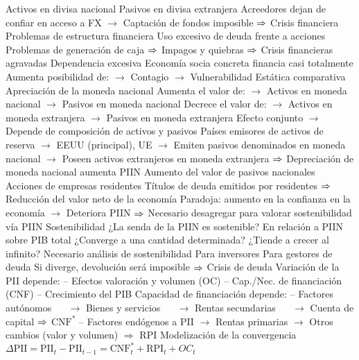 \documentclass{nuevotema}
\begin{document}
\begin{esquemal}
				\4[] Activos en divisa nacional
				\4[] Pasivos en divisa extranjera
				\4[] Acreedores dejan de confiar en acceso a FX
				\4[] $\to$ Captación de fondos imposible
				\4[] $\Rightarrow$ Crisis financiera
				\4 Problemas de estructura financiera
				\4[] Uso excesivo de deuda frente a acciones
				\4[] Problemas de generación de caja
				\4[] $\Rightarrow$ Impagos y quiebras
				\4[] $\Rightarrow$ Crisis financieras agravadas
				\4 Dependencia excesiva
				\4[] Economía socia concreta financia casi totalmente
				\4[] Aumenta posibilidad de:
				\4[] $\to$ Contagio
				\4[] $\to$ Vulnerabilidad
			\3 Estática comparativa
				\4 Apreciación de la moneda nacional
				\4[] Aumenta el valor de:
				\4[] $\to$ Activos en moneda nacional
				\4[] $\to$ Pasivos en moneda nacional
				\4[] Decrece el valor de:
				\4[] $\to$ Activos en moneda extranjera
				\4[] $\to$ Pasivos en moneda extranjera
				\4[] Efecto conjunto
				\4[] $\to$ Depende de composición de activos y pasivos
				\4[] Países emisores de activos de reserva
				\4[] $\to$ EEUU (principal), UE
				\4[] $\to$ Emiten pasivos denominados en moneda nacional
				\4[] $\to$ Poseen activos extranjeros en moneda extranjera
				\4[] $\Rightarrow$ Depreciación de moneda nacional aumenta PIIN
				\4 Aumento del valor de pasivos nacionales
				\4[] Acciones de empresas residentes
				\4[] Títulos de deuda emitidos por residentes
				\4[] $\Rightarrow$ Reducción del valor neto de la economía
				\4[] Paradoja: aumento en la confianza en la economía
				\4[] $\to$ Deteriora PIIN
				\4[] $\Rightarrow$ Necesario desagregar para valorar sostenibilidad vía PIIN
			\3 Sostenibilidad
				\4 ¿La senda de la PIIN es sostenible?
				\4[] En relación a PIIN sobre PIB total
				\4[] ¿Converge a una cantidad determinada?
				\4[] ¿Tiende a crecer al infinito?
				\4 Necesario análisis de sostenibilidad
				\4[] Para inversores
				\4[] Para gestores de deuda
				\4[] Si diverge, devolución será imposible
				\4[] $\Rightarrow$ Crisis de deuda
				\4 Variación de la PII depende:
				\4[] -- Efectos valoración y volumen (OC)
				\4[] -- Cap./Nec. de financiación (CNF)
				\4[] -- Crecimiento del PIB
				\4 Capacidad de financiación depende:
				\4[] -- Factores autónomos
				\4[] $\quad$ $\to$ Bienes y servicios
				\4[] $\quad$ $\to$ Rentas secundarias
				\4[] $\quad$ $\to$ Cuenta de capital
				\4[] $\Rightarrow$ $\text{CNF}^*$
				\4[] -- Factores endógenos a PII
				\4[] $\to$ Rentas primarias
				\4[] $\to$ Otros cambios (valor y volumen)
				\4[] $\Rightarrow$ RPI
				\4 Modelización de la convergencia
				\4[] $\Delta \text{PII} = \text{PII}_t - \text{PII}_{t-1} = \text{CNF}^*_t + \text{RPI}_t + OC_t$

\end{esquemal}
\end{document}
